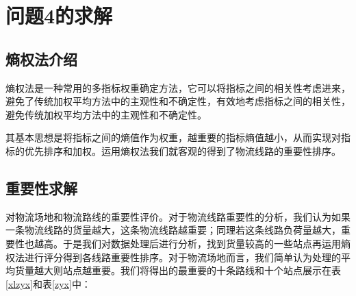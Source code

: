 \documentclass{MathorCupmodeling}
\begin{document}




















\clearpage
\section{问题4的求解}
\subsection{熵权法介绍}
熵权法是一种常用的多指标权重确定方法，它可以将指标之间的相关性考虑进来，避免了传统加权平均方法中的主观性和不确定性，有效地考虑指标之间的相关性，避免传统加权平均方法中的主观性和不确定性。

其基本思想是将指标之间的熵值作为权重，越重要的指标熵值越小，从而实现对指标的优先排序和加权。运用熵权法我们就客观的得到了物流线路的重要性排序。
\subsection{重要性求解}
对物流场地和物流路线的重要性评价。对于物流线路重要性的分析，我们认为如果一条物流线路的货量越大，这条物流线路越重要；同理若这条线路负荷量越大，重要性也越高。于是我们对数据处理后进行分析，找到货量较高的一些站点再运用熵权法进行评分得到各线路重要性排序。对于物流场地而言，我们简单认为处理的平均货量越大则站点越重要。我们将得出的最重要的十条路线和十个站点展示在表\ref{xlzyx}和表\ref{zyx}中：
\end{document}
